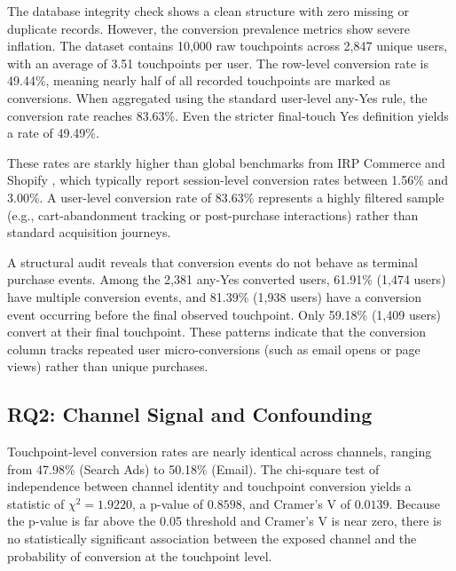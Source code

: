 \documentclass[pdflatex,sn-basic,Numbered]{sn-jnl}
\begin{document}
The database integrity check shows a clean structure with zero missing or duplicate records. However, the conversion prevalence metrics show severe inflation. The dataset contains 10,000 raw touchpoints across 2,847 unique users, with an average of 3.51 touchpoints per user. The row-level conversion rate is 49.44\%, meaning nearly half of all recorded touchpoints are marked as conversions. When aggregated using the standard user-level any-Yes rule, the conversion rate reaches 83.63\%. Even the stricter final-touch Yes definition yields a rate of 49.49\%.

These rates are starkly higher than global benchmarks from IRP Commerce \cite{irpcommerce2026} and Shopify \cite{shopify2026conversion}, which typically report session-level conversion rates between 1.56\% and 3.00\%. A user-level conversion rate of 83.63\% represents a highly filtered sample (e.g., cart-abandonment tracking or post-purchase interactions) rather than standard acquisition journeys.

A structural audit reveals that conversion events do not behave as terminal purchase events. Among the 2,381 any-Yes converted users, 61.91\% (1,474 users) have multiple conversion events, and 81.39\% (1,938 users) have a conversion event occurring before the final observed touchpoint. Only 59.18\% (1,409 users) convert at their final touchpoint. These patterns indicate that the conversion column tracks repeated user micro-conversions (such as email opens or page views) rather than unique purchases.

\subsection{RQ2: Channel Signal and Confounding}

Touchpoint-level conversion rates are nearly identical across channels, ranging from 47.98\% (Search Ads) to 50.18\% (Email). The chi-square test of independence between channel identity and touchpoint conversion yields a statistic of $\chi^2 = 1.9220$, a p-value of $0.8598$, and Cramer's V of $0.0139$. Because the p-value is far above the 0.05 threshold and Cramer's V is near zero, there is no statistically significant association between the exposed channel and the probability of conversion at the touchpoint level.
\end{document}
